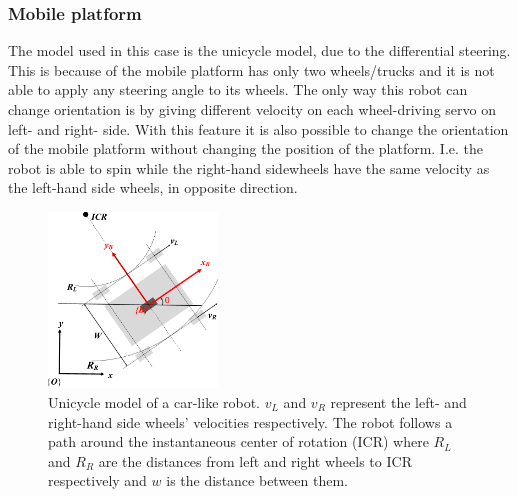 \subsubsection{Mobile platform}
The model used in this case is the unicycle model, due to the differential steering. 
This is because of the mobile platform has only two wheels/trucks and it is not able to apply any steering angle to its wheels. 
The only way this robot can change orientation is by giving different velocity on each wheel-driving servo on left- and right- side. 
With this feature it is also possible to change the orientation of the mobile platform without changing the position of the platform. 
I.e. the robot is able to spin while the right-hand sidewheels have the same velocity as the left-hand side wheels, in opposite direction. 

\begin{figure}[h!]
\centering
\includegraphics[width=0.4\textwidth]{sections/assets/car-unicycle.png}
\caption{Unicycle model of a car-like robot. 
$v_L$ and $v_R$ represent the left- and right-hand side wheels' velocities respectively. 
The robot follows a path around the instantaneous center of rotation (ICR) where $R_L$ and $R_R$ are the distances from left and right wheels to ICR respectively and $w$ is the distance between them.}
\label{fig:UnicycleModel}
\end{figure} 

